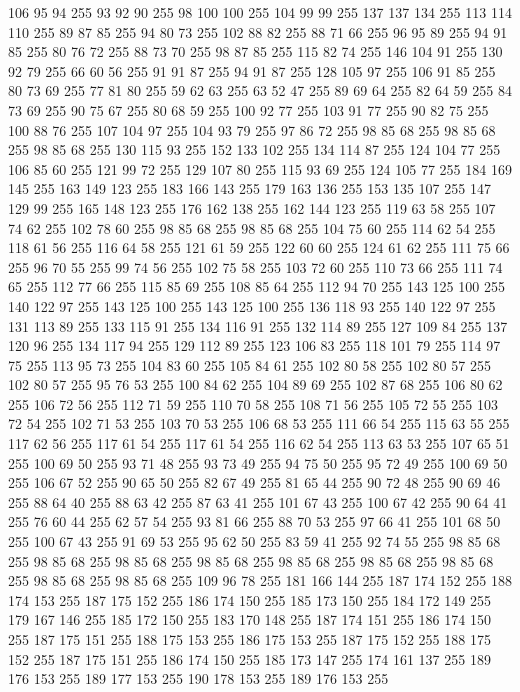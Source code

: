 106 95 94 255 93 92 90 255 98 100 100 255 104 99 99 255 137 137 134 255 113 114 110 255 89 87 85 255 94 80 73 255 102 88 82 255 88 71 66 255 96 95 89 255 94 91 85 255 80 76 72 255 88 73 70 255 98 87 85 255 115 82 74 255 146 104 91 255 130 92 79 255 66 60 56 255 91 91 87 255 94 91 87 255 128 105 97 255 106 91 85 255 80 73 69 255 77 81 80 255 59 62 63 255 63 52 47 255 89 69 64 255 82 64 59 255 84 73 69 255 90 75 67 255 80 68 59 255 100 92 77 255 103 91 77 255 90 82 75 255 100 88 76 255 107 104 97 255 104 93 79 255 97 86 72 255 98 85 68 255 98 85 68 255 98 85 68 255 130 115 93 255 152 133 102 255 134 114 87 255 124 104 77 255 106 85 60 255 121 99 72 255 129 107 80 255 115 93 69 255 124 105 77 255 184 169 145 255 163 149 123 255 183 166 143 255 179 163 136 255 153 135 107 255 147 129 99 255 165 148 123 255 176 162 138 255 162 144 123 255 119 63 58 255 107 74 62 255 102 78 60 255 98 85 68 255
98 85 68 255 104 75 60 255 114 62 54 255 118 61 56 255 116 64 58 255 121 61 59 255 122 60 60 255 124 61 62 255 111 75 66 255 96 70 55 255 99 74 56 255 102 75 58 255 103 72 60 255 110 73 66 255 111 74 65 255 112 77 66 255 115 85 69 255 108 85 64 255 112 94 70 255 143 125 100 255 140 122 97 255 143 125 100 255 143 125 100 255 136 118 93 255 140 122 97 255 131 113 89 255 133 115 91 255 134 116 91 255 132 114 89 255 127 109 84 255 137 120 96 255 134 117 94 255 129 112 89 255 123 106 83 255 118 101 79 255 114 97 75 255 113 95 73 255 104 83 60 255 105 84 61 255 102 80 58 255 102 80 57 255 102 80 57 255 95 76 53 255 100 84 62 255 104 89 69 255 102 87 68 255 106 80 62 255 106 72 56 255 112 71 59 255 110 70 58 255 108 71 56 255 105 72 55 255 103 72 54 255 102 71 53 255 103 70 53 255 106 68 53 255 111 66 54 255 115 63 55 255 117 62 56 255 117 61 54 255 117 61 54 255 116 62 54 255 113 63 53 255 107 65 51 255
100 69 50 255 93 71 48 255 93 73 49 255 94 75 50 255 95 72 49 255 100 69 50 255 106 67 52 255 90 65 50 255 82 67 49 255 81 65 44 255 90 72 48 255 90 69 46 255 88 64 40 255 88 63 42 255 87 63 41 255 101 67 43 255 100 67 42 255 90 64 41 255 76 60 44 255 62 57 54 255 93 81 66 255 88 70 53 255 97 66 41 255 101 68 50 255 100 67 43 255 91 69 53 255 95 62 50 255 83 59 41 255 92 74 55 255 98 85 68 255 98 85 68 255 98 85 68 255 98 85 68 255 98 85 68 255 98 85 68 255 98 85 68 255 98 85 68 255 98 85 68 255 109 96 78 255 181 166 144 255 187 174 152 255 188 174 153 255 187 175 152 255 186 174 150 255 185 173 150 255 184 172 149 255 179 167 146 255 185 172 150 255 183 170 148 255 187 174 151 255 186 174 150 255 187 175 151 255 188 175 153 255 186 175 153 255 187 175 152 255 188 175 152 255 187 175 151 255 186 174 150 255 185 173 147 255 174 161 137 255 189 176 153 255 189 177 153 255 190 178 153 255 189 176 153 255
